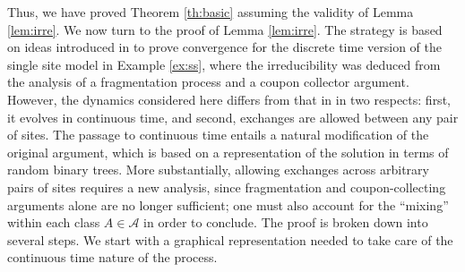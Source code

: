 \documentclass[11pt,reqno]{amsart}
\numberwithin{equation}{section}
\numberwithin{figure}{section}
\newcommand{\1}{\mathds{1}}
\newcommand{\cA}{\ensuremath{\mathcal A}}
\begin{document}
Thus, we have proved Theorem \ref{th:basic}
assuming the validity of Lemma \ref{lem:irre}.
We now turn to the proof of Lemma \ref{lem:irre}.   
The strategy is based on ideas introduced in \cite{AC2024nonlinear} to prove convergence  for the discrete time version of the single site model in Example \ref{ex:ss}, where the irreducibility was deduced from the analysis of a fragmentation process and a coupon collector argument. 
However, the dynamics considered here differs from that in \cite{AC2024nonlinear} in two respects: first, it evolves in continuous time, and second, exchanges are allowed between any pair of sites. The passage to continuous time entails a natural modification of the original argument, which is based on a representation of the solution in terms of random binary trees. More substantially, allowing exchanges across arbitrary pairs of sites requires a new analysis, since fragmentation and coupon-collecting arguments alone are no longer sufficient; one must also account for the “mixing” within each class $A\in\cA$ in order to conclude.
%
The proof is broken down into several steps. We start with a graphical representation needed to take care of the continuous time nature of the process. 
\end{document}
